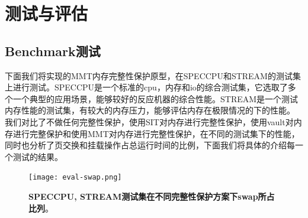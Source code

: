 \chapter{测试与评估}

\section{Benchmark测试}
下面我们将实现的MMT内存完整性保护原型，在SPECCPU和STREAM的测试集上进行测试。SPECCPU是一个标准的cpu，内存和io的综合测试集，它选取了多个一个典型的应用场景，能够较好的反应机器的综合性能。STREAM是一个测试内存性能的测试集，有较大的内存压力，能够评估内存在极限情况的下的性能。
我们对比了不做任何完整性保护，使用SIT对内存进行完整性保护，使用vault对内存进行完整保护和使用MMT对内存进行完整性保护，在不同的测试集下的性能，同时也分析了页交换和挂载操作占总运行时间的比例，下面我们将具体的介绍每一个测试的结果。

\begin{figure}[!htp]
    \centering
    \texttt{[image: eval-swap.png]}
    \caption{\textbf{SPECCPU, STREAM测试集在不同完整性保护方案下swap所占比列}。}
   \label{fig:eval-swap}
\end{figure}





